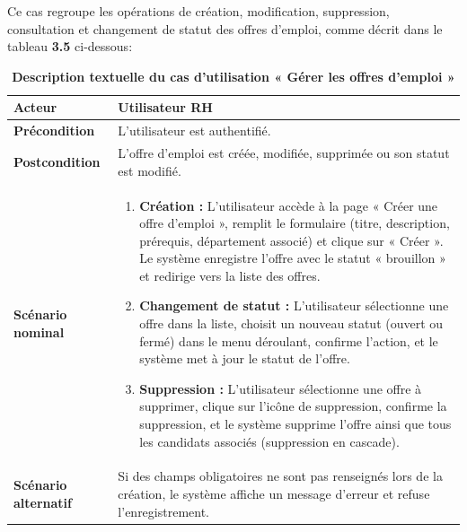 \documentclass[12pt,a4paper,oneside]{report}
\begin{document}
\begin{itemize}
Ce cas regroupe les opérations de création, modification, suppression, consultation et changement de statut des offres d'emploi, comme décrit dans le tableau \textbf{3.5} ci-dessous:
\vspace{3cm}
\begin{longtable}{|p{3.5cm}|p{11cm}|}
\caption{\textbf{Description textuelle du cas d'utilisation « Gérer les offres d'emploi »}}
\label{tab:uc-jobpostings}
\hline
\textbf{Acteur} & Utilisateur RH \\ \hline
\textbf{Précondition} & L'utilisateur est authentifié. \\ \hline
\textbf{Postcondition} & L'offre d'emploi est créée, modifiée, supprimée ou son statut est modifié. \\ \hline

\textbf{Scénario nominal} & 
\begin{enumerate}[nosep, leftmargin=*, after=\vspace{-\baselineskip}, before=\vspace{0mm}]
    \item \textbf{Création :} L'utilisateur accède à la page « Créer une offre d'emploi », remplit le formulaire (titre, description, prérequis, département associé) et clique sur « Créer ». Le système enregistre l'offre avec le statut « brouillon » et redirige vers la liste des offres.
    \item \textbf{Changement de statut :} L'utilisateur sélectionne une offre dans la liste, choisit un nouveau statut (ouvert ou fermé) dans le menu déroulant, confirme l'action, et le système met à jour le statut de l'offre.
    \item \textbf{Suppression :} L'utilisateur sélectionne une offre à supprimer, clique sur l'icône de suppression, confirme la suppression, et le système supprime l'offre ainsi que tous les candidats associés (suppression en cascade).
    \vspace{0.5cm}
\end{enumerate} \\ \hline

\textbf{Scénario alternatif} & 
Si des champs obligatoires ne sont pas renseignés lors de la création, le système affiche un message d'erreur et refuse l'enregistrement. \\ \hline

\end{longtable}


\end{itemize}
\end{document}
